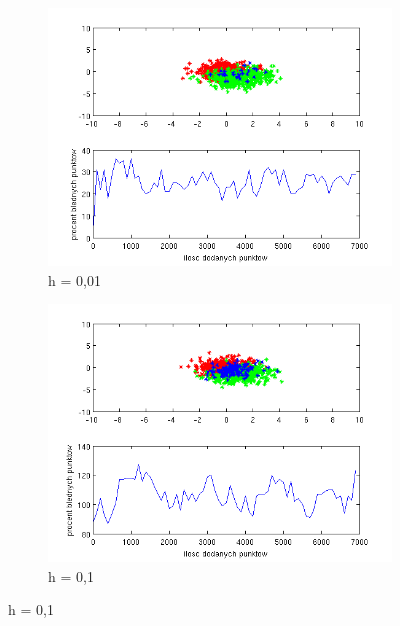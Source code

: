 \documentclass[10pt,a4paper]{article}
\begin{document}
\begin{figure}[h]
   \begin{subfigure}[b]{0.5\textwidth}
    \includegraphics[width=\textwidth]{test_h0_01.png}
    \caption{h = 0,01}
  \end{subfigure}
  \hfill
  \begin{subfigure}[b]{0.5\textwidth}
    \includegraphics[width=\textwidth]{test_h0_1.png}
    \caption{h = 0,1}
  \end{subfigure}
  

\end{figure}
\end{document}
